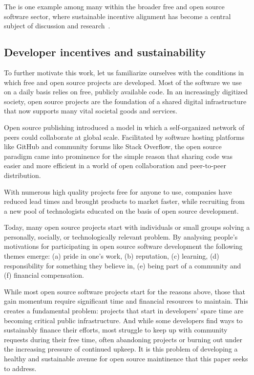 The is one example among many within the broader free and open source software
sector, where sustainable incentive alignment has become a central subject of discussion
and research~\cite{roads and bridges}.

\subsection{Developer incentives and sustainability}
\label{s:incentives}

To further motivate this work, let us familiarize ourselves with the
conditions in which free and open source projects are developed. Most of the software
we use on a daily basis relies on free, publicly available code. In an increasingly
digitized society, open source projects are the foundation of
a shared digital infrastructure that now supports many vital societal goods and services.

Open source publishing introduced a model in which a self-organized network of peers
could collaborate at global scale. Facilitated by software hosting platforms like GitHub
and community forums like Stack Overflow, the open source paradigm came into prominence
for the simple reason that sharing code was easier and more efficient
in a world of open collaboration and peer-to-peer distribution.

With numerous high quality projects free for anyone to use,
companies have reduced lead times and brought products to market
faster, while recruiting from a new pool of technologists educated on the basis of
open source development.

Today, many open source projects start with individuals or small groups
solving a personally, socially, or technologically relevant problem. By
analysing people's motivations for participating in open source software
development the following themes emerge: (a) pride in one's work, (b)
reputation, (c) learning, (d) responsibility for something they believe in, (e)
being part of a community and (f) financial compensation.


While most open source software projects start for the reasons above, those
that gain momentum require significant time and financial resources to maintain.
This creates a fundamental problem: projects that start in developers' spare time
are becoming critical public infrastructure. And while some developers
find ways to sustainably finance their efforts, most struggle to keep up with
community requests during their free time, often abandoning
projects or burning out under the increasing pressure of continued upkeep.
It is this problem of developing a healthy and sustainable avenue for open source
maintinence that this paper seeks to address.

